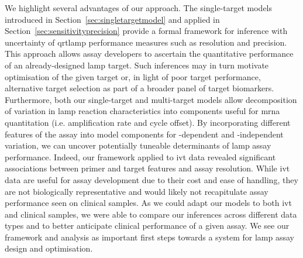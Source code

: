 \documentclass[../thesis.tex]{subfiles}
\begin{document}
We highlight several advantages of our approach. The single-target models introduced in Section~\ref{sec:singletargetmodel} and applied in Section~\ref{sec:sensitivityprecision} provide a formal framework for inference with uncertainty of \gls{qrtlamp} performance measures such as resolution and precision. This approach allows assay developers to ascertain the quantitative performance of an already-designed \gls{lamp} target. Such inferences may in turn motivate optimisation of the given target or, in light of poor target performance, alternative target selection as part of a broader panel of target biomarkers. Furthermore, both our single-target and multi-target models allow decomposition of variation in \gls{lamp} reaction characteristics into components useful for \gls{mrna} quantitation (i.e. amplification rate and cycle offset). By incorporating different features of the assay into model components for -dependent and -independent variation, we can uncover potentially tuneable determinants of \gls{lamp} assay performance. Indeed, our framework applied to \gls{ivt}  data revealed significant associations between primer and target features and assay resolution. While \gls{ivt}  data are useful for assay development due to their cost and ease of handling, they are not biologically representative and would likely not recapitulate assay performance seen on clinical samples. As we could adapt our models to both \gls{ivt}  and clinical samples, we were able to compare our inferences across different data types and to better anticipate clinical performance of a given assay. We see our framework and analysis as important first steps towards a system for \gls{lamp} assay design and optimisation.
\end{document}
